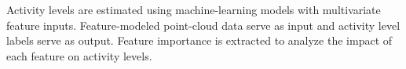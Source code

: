 Activity levels are estimated using machine-learning models with multivariate feature inputs.
Feature-modeled point-cloud data serve as input and activity level labels serve as output.
Feature importance is extracted to analyze the impact of each feature on activity levels.
